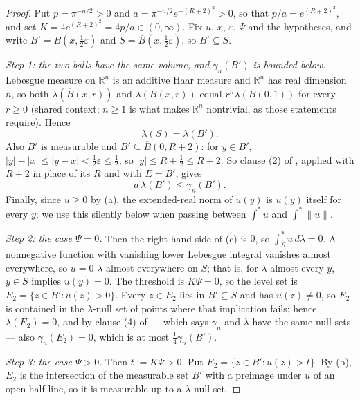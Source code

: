 \begin{proof}
Put $p = \pi^{-n/2} > 0$ and $a = \pi^{-n/2}e^{-(R+2)^2} > 0$, so that
$p/a = e^{(R+2)^2}$, and set $K = 4e^{(R+2)^2} = 4p/a \in (0,\infty)$.  Fix
$u$, $x$, $\varepsilon$, $\Psi$ and the hypotheses, and write
$B' = B(x,\tfrac12\varepsilon)$ and $S = \overline B(x,\tfrac12\varepsilon)$,
so $B' \subseteq S$.

\emph{Step 1: the two balls have the same volume, and $\gamma_n(B')$ is bounded
below.}  Lebesgue measure on $\mathbb{R}^n$ is an additive Haar measure and
$\mathbb{R}^n$ has real dimension $n$, so both
$\lambda(\overline B(x,r))$ and $\lambda(B(x,r))$ equal
$r^n\lambda(B(0,1))$ for every $r \geq 0$ (shared context; $n \geq 1$ is what
makes $\mathbb{R}^n$ nontrivial, as those statements require).  Hence
\begin{equation*}
  \lambda(S) = \lambda(B') . \tag{1}
\end{equation*}
Also $B'$ is measurable and $B' \subseteq \overline B(0,R+2)$: for $y \in B'$,
$|y| - |x| \leq |y-x| < \tfrac12\varepsilon \leq \tfrac12$, so
$|y| \leq R+\tfrac12 \leq R+2$.  So clause (2) of
, applied with $R+2$ in place of its $R$
and with $E = B'$, gives
\begin{equation*}
  a\,\lambda(B') \leq \gamma_n(B') . \tag{2}
\end{equation*}
Finally, since $u \geq 0$ by (a), the extended-real norm of $u(y)$ is $u(y)$
itself for every $y$; we use this silently below when passing between
$\int^{*}u$ and $\int^{*}\|u\|$.

\emph{Step 2: the case $\Psi = 0$.}  Then the right-hand side of (c) is $0$, so
$\int_S^{*}u\,d\lambda = 0$.  A nonnegative function with vanishing lower
Lebesgue integral vanishes almost everywhere, so $u = 0$ $\lambda$-almost
everywhere on $S$; that is, for $\lambda$-almost every $y$, $y \in S$ implies
$u(y) = 0$.  The threshold is $K\Psi = 0$, so the level set is
$E_2 = \{z \in B' : u(z) > 0\}$.  Every $z \in E_2$ lies in $B' \subseteq S$
and has $u(z) \neq 0$, so $E_2$ is contained in the $\lambda$-null set of
points where that implication fails; hence $\lambda(E_2) = 0$, and by clause
(4) of  --- which says $\gamma_n$ and
$\lambda$ have the same null sets --- also $\gamma_n(E_2) = 0$, which is at
most $\tfrac14\gamma_n(B')$.

\emph{Step 3: the case $\Psi > 0$.}  Then $t := K\Psi > 0$.  Put
$E_2 = \{z \in B' : u(z) > t\}$.  By (b), $E_2$ is the intersection of the
measurable set $B'$ with a preimage under $u$ of an open half-line, so it is
measurable up to a $\lambda$-null set.


\end{proof}
